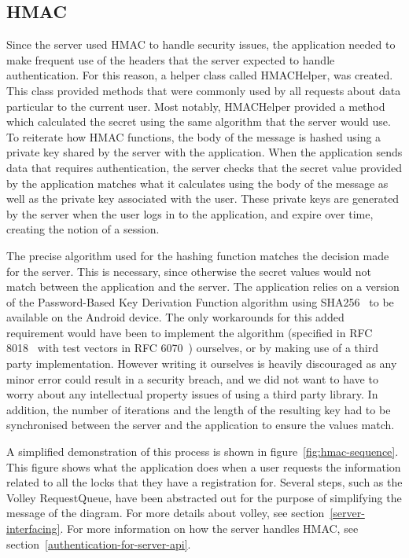 \documentclass[12pt]{report}
\let\Oldsubsection\subsection
\renewcommand{\subsection}{\FloatBarrier\Oldsubsection}
\begin{document}
\subsection{HMAC} \label{hmac}

Since the server used HMAC to handle security issues, the application needed to make frequent use of the headers that
the server expected to handle authentication. For this reason, a helper class called HMACHelper, was created. This
class provided methods that were commonly used by all requests about data particular to the current user. Most notably,
HMACHelper provided a method which calculated the secret using the same algorithm that the server would use. To
reiterate how HMAC functions, the body of the message is hashed using a private key shared by the server with the
application. When the application sends data that requires authentication, the server checks that the secret value
provided by the application matches what it calculates using the body of the message as well as the private key
associated with the user. These private keys are generated by the server when the user logs in to the application,
and expire over time, creating the notion of a session.

The precise algorithm used for the hashing function matches the decision made for the server. This is necessary, since
otherwise the secret values would not match between the application and the server. The application relies on a version
of the Password-Based Key Derivation Function algorithm using SHA256~\autocite{RFC4634} to be available on the Android device. The only
workarounds for this added requirement would have been to implement the algorithm (specified in RFC 8018~\autocite{RFC8018} with test
vectors in RFC 6070~\autocite{RFC6070}) ourselves, or by making use of a third party implementation. However writing it ourselves is
heavily discouraged as any minor error could result in a security breach, and we did not want to have to worry about
any intellectual property issues of using a third party library. In addition, the number of iterations and the length of
the resulting key had to be synchronised between the server and the application to ensure the values match.

A simplified demonstration of this process is shown in figure~\ref{fig:hmac-sequence}. This figure shows what the
application does when a user requests the information related to all the locks that they have a registration for.
Several steps, such as the Volley RequestQueue, have been abstracted out for the purpose of simplifying the message
of the diagram. For more details about volley, see section~\ref{server-interfacing}. For more information on how the
server handles HMAC, see section~\ref{authentication-for-server-api}.
\end{document}
